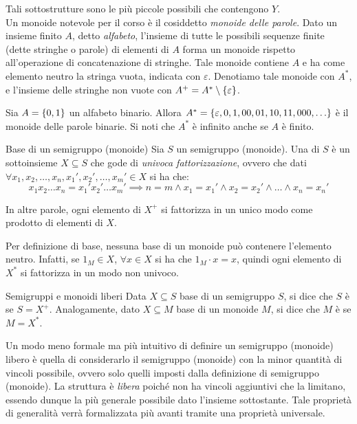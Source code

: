 Tali sottostrutture sono le più piccole possibili che contengono \(Y\).\\
Un monoide notevole per il corso è il cosiddetto \emph{monoide delle parole}.
Dato un insieme finito \(A\), detto \emph{alfabeto}, l'insieme di tutte le possibili sequenze finite (dette stringhe o parole) di elementi di \(A\) forma un monoide rispetto all'operazione di concatenazione di stringhe. 
Tale monoide contiene \(A\) e ha come elemento neutro la stringa vuota, indicata con \(\varepsilon\).
Denotiamo tale monoide con \(A^*\), e l'insieme delle stringhe non vuote con \(A^+ = A^* \setminus \set\varepsilon\).

\begin{example}{}
  Sia \(A = \set{0,1}\) un alfabeto binario.
  Allora \(A^* = \set{\varepsilon, 0, 1, 00, 01, 10, 11, 000, \ldots}\) è il monoide delle parole binarie.
  Si noti che \(A^*\) è infinito anche se \(A\) è finito.
\end{example}

\begin{definition}{Base di un semigruppo (monoide)}
  Sia \(S\) un semigruppo (monoide).
  Una  di \(S\) è un sottoinsieme \(X \subseteq S\) che gode di \emph{univoca fattorizzazione}, ovvero che dati \(\forall x_1,x_2,\ldots,x_n,x_1',x_2',\ldots,x_m' \in X\) si ha che:
  \[x_1 x_2 \ldots x_n = x_1' x_2' \ldots x_m' \implies n=m \land x_1 = x_1' \land x_2 = x_2' \land \ldots \land x_n = x_n'\]
\end{definition}
In altre parole, ogni elemento di \(X^{+}\) si fattorizza in un unico modo come prodotto di elementi di \(X\).

\begin{observation}[label=obs:no_neutral_in_base]{}
  Per definizione di base, nessuna base di un monoide può contenere l'elemento neutro.
  Infatti, se \(1_M \in X\), \(\forall x \in X\) si ha che \(1_M \cdot x = x\), quindi ogni elemento di \(X^{*}\) si fattorizza in un modo non univoco.
\end{observation}

\begin{definition}{Semigruppi e monoidi liberi}
  Data \(X \subseteq S\) base di un semigruppo \(S\), si dice che \(S\) è  se \(S = X^{+}\).
  Analogamente, dato \(X \subseteq M\) base di un monoide \(M\), si dice che \(M\) è  se \(M = X^{*}\).
\end{definition}
Un modo meno formale ma più intuitivo di definire un semigruppo (monoide) libero è quella di considerarlo il semigruppo (monoide) con la minor quantità di vincoli possibile, ovvero solo quelli imposti dalla definizione di semigruppo (monoide).
La struttura è \emph{libera} poiché non ha vincoli aggiuntivi che la limitano, essendo dunque la più generale possibile dato l'insieme sottostante.
Tale proprietà di generalità verrà formalizzata più avanti tramite una proprietà universale.


